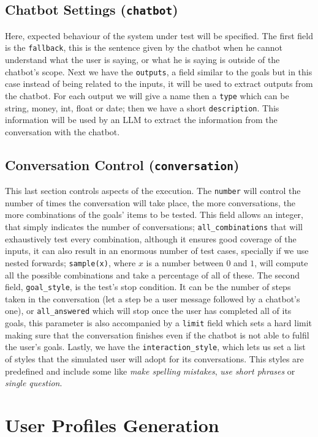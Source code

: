 \subsection{Chatbot Settings (\texttt{chatbot})}

Here, expected behaviour of the system under test will be specified.
The first field is the \texttt{fallback},
this is the sentence given by the chatbot when he cannot understand what the user is saying,
or what he is saying is outside of the chatbot's scope.
Next we have the \texttt{outputs}, a field similar to the goals
but in this case instead of being related to the inputs,
it will be used to extract outputs from the chatbot.
For each output we will give a name
then a \texttt{type} which can be string, money, int, float or date;
then we have a short \texttt{description}.
This information will be used by an \ac{LLM}
to extract the information from the conversation with the chatbot.


\subsection{Conversation Control (\texttt{conversation})}

This last section controls aspects of the execution.
The \texttt{number} will control the number of times the conversation will take place,
the more conversations, the more combinations of the goals' items to be tested.
This field allows an integer, that simply indicates the number of conversations;
\texttt{all\_combinations} that will exhaustively test every combination,
although it ensures good coverage of the inputs,
it can also result in an enormous number of test cases, specially if we use nested forwards;
\texttt{sample(x)}, where $x$ is a number between $0$ and $1$,
will compute all the possible combinations
and take a percentage of all of these.
The second field, \texttt{goal\_style}, is the test's stop condition.
It can be the number of steps taken in the conversation
(let a step be a user message followed by a chatbot's one),
or \texttt{all\_answered} which will stop once the user has completed all of its goals,
this parameter is also accompanied by a \texttt{limit} field which sets a hard limit
making sure that the conversation finishes even if the chatbot is not able to fulfil the user's goals.
Lastly, we have the \texttt{interaction\_style},
which lets us set a list of styles that the simulated user will adopt for its conversations.
This styles are predefined and include some like \textit{make spelling mistakes}, \textit{use short phrases}
or \textit{single question}.

\section{User Profiles Generation}\label{sec:profile-generation}
